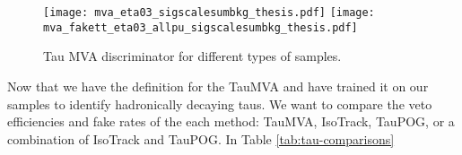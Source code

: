 \begin{figure}[!htb]
	\begin{center}
		\texttt{[image: mva\_eta03\_sigscalesumbkg\_thesis.pdf]}
		\texttt{[image: mva\_fakett\_eta03\_allpu\_sigscalesumbkg\_thesis.pdf]} \\
	\end{center}
	\caption[Tau MVA Discriminator]{Tau MVA discriminator for different types of samples.
	}
	\label{fig:tau-discriminator}
\end{figure}



Now that we have the definition for the TauMVA and have trained it on our samples to identify hadronically decaying taus. We want to compare the veto efficiencies and fake rates of the each method: TauMVA, IsoTrack, TauPOG, or a combination of IsoTrack and TauPOG. In Table \ref{tab:tau-comparisons}